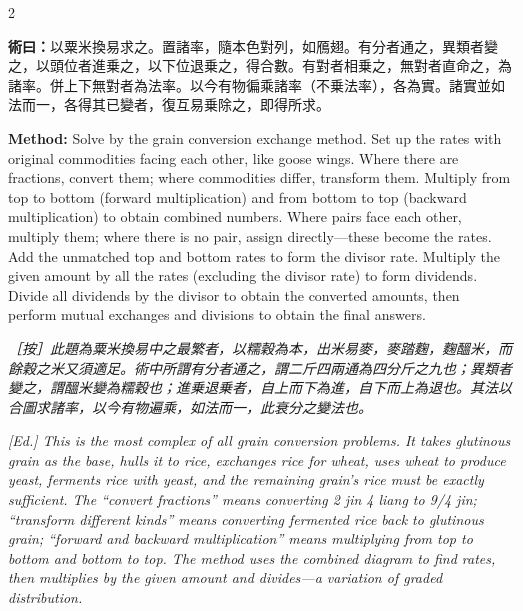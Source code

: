 \documentclass[11pt,a4paper]{article}
\newcommand{\MethodText}[1]{\par\noindent\textbf{\color{methodcolor}術曰：}#1\par}
\newcommand{\EdNoteText}[1]{\par\noindent\textit{\color{ednotecolor}［按］#1}\par}
\newcommand{\MethodEn}[1]{\par\noindent\textbf{\color{methodcolor}Method:} #1\par}
\newcommand{\EdNoteEn}[1]{\par\noindent\textit{\color{ednotecolor}[Ed.] #1}\par}
\begin{document}
\begin{paracol}{2}
\MethodText{以粟米換易求之。置諸率，隨本色對列，如鴈翅。有分者通之，異類者變之，以頭位者進乗之，以下位退乗之，得合數。有對者相乗之，無對者直命之，為諸率。併上下無對者為法率。以今有物徧乘諸率（不乗法率），各為實。諸實並如法而一，各得其已變者，復互易乗除之，即得所求。}
\switchcolumn
\MethodEn{Solve by the grain conversion exchange method. Set up the rates with original commodities facing each other, like goose wings. Where there are fractions, convert them; where commodities differ, transform them. Multiply from top to bottom (forward multiplication) and from bottom to top (backward multiplication) to obtain combined numbers. Where pairs face each other, multiply them; where there is no pair, assign directly---these become the rates. Add the unmatched top and bottom rates to form the divisor rate. Multiply the given amount by all the rates (excluding the divisor rate) to form dividends. Divide all dividends by the divisor to obtain the converted amounts, then perform mutual exchanges and divisions to obtain the final answers.}
\switchcolumn*

\EdNoteText{此題為粟米換易中之最繁者，以糯穀為本，出米易麥，麥踏麴，麴醞米，而餘穀之米又須適足。術中所謂有分者通之，謂二斤四兩通為四分斤之九也；異類者變之，謂醞米變為糯穀也；進乗退乗者，自上而下為進，自下而上為退也。其法以合圖求諸率，以今有物遍乘，如法而一，此衰分之變法也。}
\switchcolumn
\EdNoteEn{This is the most complex of all grain conversion problems. It takes glutinous grain as the base, hulls it to rice, exchanges rice for wheat, uses wheat to produce yeast, ferments rice with yeast, and the remaining grain's rice must be exactly sufficient. The ``convert fractions'' means converting 2 jin 4 liang to 9/4 jin; ``transform different kinds'' means converting fermented rice back to glutinous grain; ``forward and backward multiplication'' means multiplying from top to bottom and bottom to top. The method uses the combined diagram to find rates, then multiplies by the given amount and divides---a variation of graded distribution.}

\end{paracol}
\end{document}
